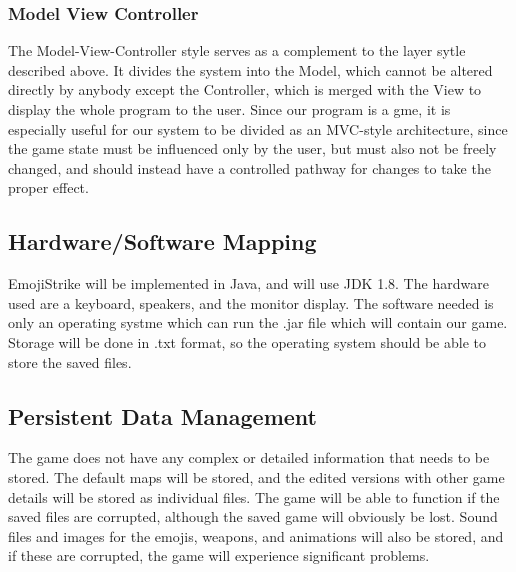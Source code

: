 \documentclass[12pt]{article} %
\begin{document}

\subsubsection{Model View Controller} %

The Model-View-Controller style serves as a complement to the layer sytle described above. It divides the system into the Model, which cannot be altered directly by anybody except the Controller, which is merged with the View to display the whole program to the user. Since our program is a gme, it is especially useful for our system to be divided as an MVC-style architecture, since the game state must be influenced only by the user, but must also not be freely changed, and should instead have a controlled pathway for changes to take the proper effect.


\subsection{Hardware/Software Mapping} %

EmojiStrike will be implemented in Java, and will use JDK 1.8. The hardware used are a keyboard, speakers, and the monitor display. The software needed is only an operating systme which can run the .jar file which will contain our game. Storage will be done in .txt format, so the operating system should be able to store the saved files.


\subsection{Persistent Data Management} %

The game does not have any complex or detailed information that needs to be stored. The default maps will be stored, and the edited versions with other game details will be stored as individual files. The game will be able to function if the saved files are corrupted, although the saved game will obviously be lost. Sound files and images for the emojis, weapons, and animations will also be stored, and if these are corrupted, the game will experience significant problems.

\end{document}
